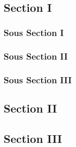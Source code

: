 \doublespace
{}
\ChTitleVar{\raggedleft\Large\sffamily\bfseries}


\chapter{\@nomChap}
\vspace{3cm}
\begin{center}
\\
\end{center}

\clearpage

\section{Section I}
\lipsum[1-3] %

\subsection{Sous Section I}
\lipsum[1-3]

\subsection{Sous Section II}
\lipsum[1-3]

\subsection{Sous Section III}
\lipsum[1-3]

\section{Section II}
\lipsum[1-3]

\section{Section III}
\lipsum[1-5]